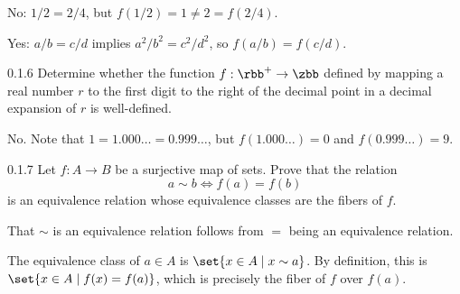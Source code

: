 \begin{solenum}
    \item No: $1/2 = 2/4$, but $f(1/2) = 1 \neq 2 = f(2/4)$.
    \item Yes: $a/b = c/d$ implies $a^2/b^2 = c^2/d^2$, so $f(a/b) = f(c/d)$.
\end{solenum}

\begin{exercise}{0.1.6}
    Determine whether the function $f: \rbb^+ \to \zbb$ defined by mapping a real number $r$ to the first digit to the right of the decimal point in a decimal expansion of $r$ is well-defined.
\end{exercise}

\begin{sol}
    No.
	Note that $1=1.000\ldots = 0.999\ldots$, but $f(1.000\ldots) = 0$ and $f(0.999\ldots) = 9$.
\end{sol}

\begin{exercise}{0.1.7}
    Let $f: A \to B$ be a surjective map of sets.
	Prove that the relation
    \[
    	a \sim b \iff f(a) = f(b)
    \]
    is an equivalence relation whose equivalence classes are the fibers of $f$.
\end{exercise}

\begin{sol}
    That $\sim$ is an equivalence relation follows from $=$ being an equivalence relation.

    The equivalence class of $a \in A$ is $\set{x \in A \mid x \sim a}$.
	By definition, this is $\set{x \in A \mid f(x) = f(a)}$, which is precisely the fiber of $f$ over $f(a)$.
\end{sol}
